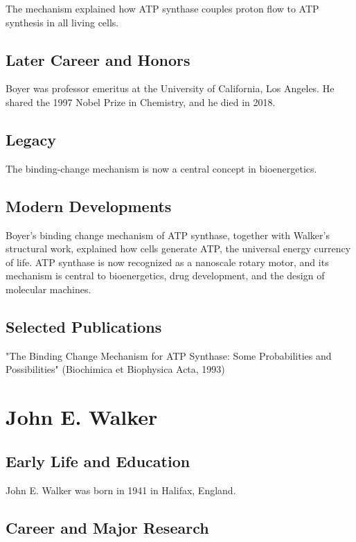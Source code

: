 The mechanism explained how ATP synthase couples proton flow to ATP synthesis in all living cells.

\subsection*{Later Career and Honors}

Boyer was professor emeritus at the University of California, Los Angeles. He shared the 1997 Nobel Prize in Chemistry, and he died in 2018.

\subsection*{Legacy}

The binding-change mechanism is now a central concept in bioenergetics.

\subsection*{Modern Developments}

Boyer's binding change mechanism of ATP synthase, together with Walker's structural work, explained how cells generate ATP, the universal energy currency of life. ATP synthase is now recognized as a nanoscale rotary motor, and its mechanism is central to bioenergetics, drug development, and the design of molecular machines.

\subsection*{Selected Publications}

"The Binding Change Mechanism for ATP Synthase: Some Probabilities and Possibilities" (Biochimica et Biophysica Acta, 1993)

\clearpage

\section{John E. Walker}

\subsection*{Early Life and Education}

John E. Walker was born in 1941 in Halifax, England.

\subsection*{Career and Major Research}

